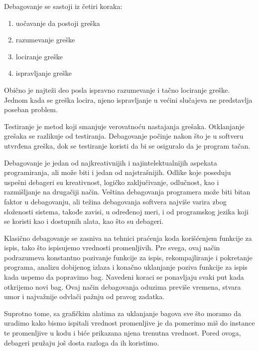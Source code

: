 \documentclass[a4paper]{article}
\begin{document}
\vspace{4mm}
Debagovanje se sastoji iz četiri koraka:
\begin{enumerate}
\item uočavanje da postoji greška
\item razumevanje greške
\item lociranje greške
\item ispravljanje greške
\end{enumerate}

\vspace{4mm}

Obično je najteži deo posla ispravno razumevanje i tačno lociranje greške. Jednom kada 
se greška locira, njeno ispravljanje u većini slučajeva ne predstavlja poseban problem.

Testiranje je metod koji smanjuje verovatnoću nastajanja grešaka.
Otklanjanje grešaka se razlikuje od testiranja. Debagovanje počinje
nakon što je u softveru utvrđena greška, dok se testiranje koristi da bi
se osiguralo da je program tačan.

Debagovanje je jedan od najkreativnijih i najintelektualnijih aspekata programiranja, 
ali može biti i jedan od najstrašnijih. Odlike koje poseduju uspešni debageri su 
kreativnost, logičko zaključivanje, odlučnost, kao i razmišljanje na drugačiji način.
Veština debagovanja programera može biti bitan faktor u debagovanju, ali težina 
debagovanja softvera najviše varira zbog složenosti sistema, takođe zavisi, u određenoj 
meri, i od programskog jezika koji se koristi kao i dostupnih alata, kao što su 
debageri. 

Klasično debagovanje se zasniva na tehnici praćenja koda korišćenjem funkcije za ispis, tako što 
ispisujemo vrednosti promenljivih. Pre svega, ovaj način podrazumeva konstantno pozivanje funkcije za 
ispis, rekompajliranje i pokretanje programa, analizu dobijenog izlaza i konačno uklanjanje 
poziva funkcije za ispis kada uspemo da popravimo bag. Navedeni koraci se ponavljaju svaki put 
kada otkrijemo novi bag. Ovaj način debagovanja oduzima previše vremena, stvara umor i najvažnije
odvlači pažnju od pravog zadatka.

Suprotno tome, sa grafičkim alatima za uklanjanje bagova sve što moramo da uradimo kako bismo 
ispitali vrednost promenljive je da pomerimo miš do instance te promenljive u kodu i biće
prikazana njena trenutna vrednost. Pored ovoga, debageri pružaju još dosta razloga da ih koristimo.\cite{art_debugging}
\end{document}
